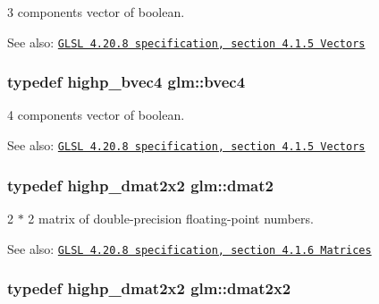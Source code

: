 3 components vector of boolean.

\begin{Desc}
\item[See also:]\href{http://www.opengl.org/registry/doc/GLSLangSpec.4.20.8.pdf}{\tt GLSL 4.20.8 specification, section 4.1.5 Vectors} \end{Desc}
\hypertarget{group__core__types_g6bb211b3d3bebae3867548d5673ca5cd}{
\subsubsection[bvec4]{\setlength{\rightskip}{0pt plus 5cm}typedef highp\_\-bvec4 {\bf glm::bvec4}}}
\label{group__core__types_g6bb211b3d3bebae3867548d5673ca5cd}


4 components vector of boolean.

\begin{Desc}
\item[See also:]\href{http://www.opengl.org/registry/doc/GLSLangSpec.4.20.8.pdf}{\tt GLSL 4.20.8 specification, section 4.1.5 Vectors} \end{Desc}
\hypertarget{group__core__types_gd8c130d26c4cd9a1a831c1a74292a8f6}{
\subsubsection[dmat2]{\setlength{\rightskip}{0pt plus 5cm}typedef highp\_\-dmat2x2 {\bf glm::dmat2}}}
\label{group__core__types_gd8c130d26c4cd9a1a831c1a74292a8f6}


2 $\ast$ 2 matrix of double-precision floating-point numbers.

\begin{Desc}
\item[See also:]\href{http://www.opengl.org/registry/doc/GLSLangSpec.4.20.8.pdf}{\tt GLSL 4.20.8 specification, section 4.1.6 Matrices} \end{Desc}
\hypertarget{group__core__types_ge9932771e11a4f38e21f1136423bab18}{
\subsubsection[dmat2x2]{\setlength{\rightskip}{0pt plus 5cm}typedef highp\_\-dmat2x2 {\bf glm::dmat2x2}}}
\label{group__core__types_ge9932771e11a4f38e21f1136423bab18}


